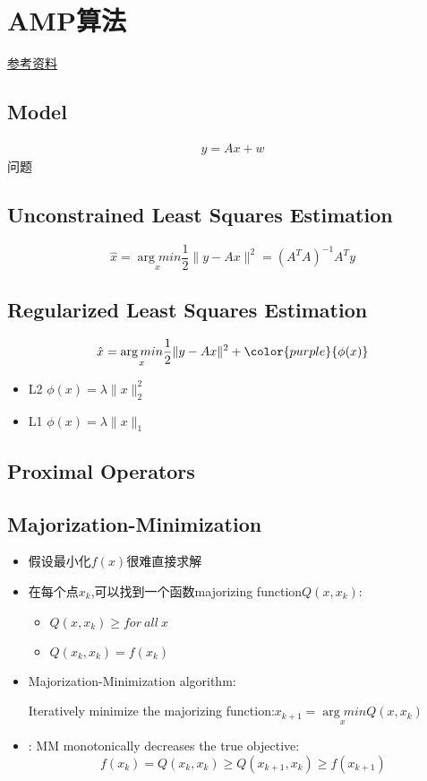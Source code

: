 \section{AMP算法}
\href{https://krzakala.github.io/cargese.io/AMP_Tutorial_18.pdf}{参考资料}
\subsection{Model}
\begin{eqnarray}
    y=Ax+w
\end{eqnarray}
问题{\color{red}{怎么从y和A估计x，使得x的估计和x间在某一准则下最小}}
\subsection{Unconstrained Least Squares Estimation}
\begin{equation}
    \hat{x}=\underset{x}{\arg min}\frac{1}{2}\|y-Ax\|^2=(A^TA)^{-1}A^Ty
\end{equation}
\subsection{Regularized Least Squares Estimation}
\begin{equation}
    \hat{x}=\underset{x}{\arg min}\frac{1}{2}\|y-Ax\|^2+{\color{purple}{\phi(x)}}
\end{equation}
\begin{itemize}
    \item L2 $\phi(x)=\lambda\|x\|^2_2$
    \item L1 $\phi(x)=\lambda\|x\|_1$
\end{itemize}
\subsection{Proximal Operators}
\subsection{Majorization-Minimization}
\begin{itemize}
    \item 假设最小化$f(x)$很难直接求解
    \item 在每个点$x_k$,可以找到一个函数majorizing function$Q(x,x_k)$:
    \begin{itemize}
        \item $Q(x,x_k)\geq for\ all\ x$
        \item $Q(x_k,x_k)=f(x_k)$
    \end{itemize}
    \item Majorization-Minimization algorithm: \par 
    Iteratively minimize the majorizing function:$x_{k+1}=\underset{x}{\arg min}Q(x,x_k)$
    \item {\color{purple}{Theorem}}: MM monotonically decreases the true objective: 
    $$f(x_k)=Q(x_k,x_k)\geq Q(x_{k+1},x_k)\geq f(x_{k+1})$$
\end{itemize}

